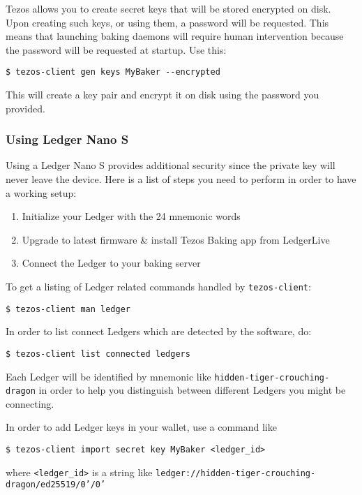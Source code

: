 \documentclass[a4paper,twocolumn,10pt]{article}
\begin{document}
Tezos allows you to create secret keys that will be stored encrypted
on disk. Upon creating such keys, or using them, a password will be
requested. This means that launching baking daemons will require human
intervention because the password will be requested at startup. Use this:

\lstinline[style=BashInputStyle]'$ tezos-client gen keys MyBaker --encrypted'

This will create a key pair and encrypt it on disk using the password
you provided.

\subsubsection{Using Ledger Nano S}

Using a Ledger Nano S provides additional security since the private
key will never leave the device. Here is a list of steps you need to
perform in order to have a working setup:

\begin{footnotesize}
\begin{enumerate}
\item Initialize your Ledger with the 24 mnemonic words
\item Upgrade to latest firmware \& install Tezos Baking app from
  LedgerLive
\item Connect the Ledger to your baking server
\end{enumerate}
\end{footnotesize}

To get a listing of Ledger related commands handled by
\texttt{tezos-client}:

\lstinline[style=BashInputStyle]'$ tezos-client man ledger'

In order to list connect Ledgers which are detected by the software,
do:

\lstinline[style=BashInputStyle]'$ tezos-client list connected ledgers'

Each Ledger will be identified by mnemonic like
\texttt{hidden-tiger-crouching-dragon} in order to help you
distinguish between different Ledgers you might be connecting.

In order to add Ledger keys in your wallet, use a command like

\lstinline[style=BashInputStyle]'$ tezos-client import secret key MyBaker <ledger_id>'

where \texttt{<ledger\_id>} is a string like {\footnotesize \texttt{ledger://hidden-tiger-crouching-dragon/ed25519/0'/0'}}
\end{document}
